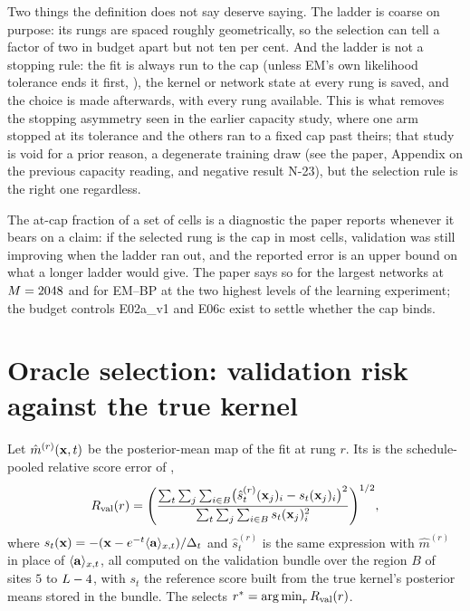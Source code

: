 Two things the definition does not say deserve saying. The ladder is coarse on purpose:
its rungs are spaced roughly geometrically, so the selection can tell a factor of two
in budget apart but not ten per cent. And the ladder is not a stopping rule: the fit is
always run to the cap (unless EM's own likelihood tolerance ends it first,
), the kernel or network state at every rung is saved, and
the choice is made afterwards, with every rung available. This is what removes the
stopping asymmetry seen in the earlier capacity study, where one arm stopped at its
tolerance and the others ran to a fixed cap past theirs; that study is void for a prior
reason, a degenerate training draw (see the paper, Appendix on the previous capacity
reading, and negative result N-23), but the selection rule is the right one regardless.

The at-cap fraction of a set of cells is a diagnostic the paper reports whenever it
bears on a claim: if the selected rung is the cap in most cells, validation was still
improving when the ladder ran out, and the reported error is an upper bound on what a
longer ladder would give. The paper says so for the largest networks at
$M=2048$ and for EM--BP at the two highest levels of the learning experiment; the
budget controls E02a\_v1 and E06c exist to settle whether the cap binds.

\section{Oracle selection: validation risk against the true kernel}
\label{sec:oracle-selection}

\begin{definition}
\label{def:oracle-rule}
Let $\hat m^{(r)}(\mathbf{x},t)$ be the posterior-mean map of the fit at rung $r$. Its
 is the schedule-pooled relative score error of
,
\begin{equation}
  R_{\mathrm{val}}(r)=\Biggl(\frac{\sum_t\sum_{j}\sum_{i\in B}\bigl(\hat s^{(r)}_t(\mathbf{x}_j)_i-s_t(\mathbf{x}_j)_i\bigr)^2}{\sum_t\sum_j\sum_{i\in B}s_t(\mathbf{x}_j)_i^2}\Biggr)^{1/2},
  \label{eq:val-risk}
\end{equation}
where $s_t(\mathbf{x})=-(\mathbf{x}-e^{-t}\langle \mathbf{a} \rangle_{x,t})/\Delta_t$ and $\hat s^{(r)}_t$ is the same expression
with $\hat m^{(r)}$ in place of $\langle \mathbf{a} \rangle_{x,t}$,
all computed on the validation bundle over the  region $B$ of sites $5$ to
$L-4$, with $s_t$ the reference score built from the true kernel's posterior means
stored in the bundle. The  selects $r^\ast=\operatorname*{arg\,min}_rR_{\mathrm{val}}(r)$.
\end{definition}

